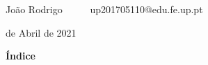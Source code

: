 \documentclass[12pt]{article}
\renewcommand{\_}{\kern-1.5pt\textunderscore\kern-1.5pt}
\begin{document}
\begin{adjustwidth}{0.25in}{0.0in}
{\fontsize{15pt}{18.0pt}\selectfont João Rodrigo \tab \tab \tab \ \ \ \ \  up201705110@edu.fe.up.pt}
\end{adjustwidth}


\vspace{\baselineskip}
\begin{Center}
{\fontsize{16pt}{19.2pt} de Abril de 2021}
\end{Center}

\vspace{\baselineskip}

\vspace{\baselineskip}
{\fontsize{20pt}{24.0pt}\selectfont \textbf{Índice}}

\vspace{\baselineskip}

\vspace{\baselineskip}

\vspace{\baselineskip}

\vspace{\baselineskip}

\vspace{\baselineskip}

\vspace{\baselineskip}

\vspace{\baselineskip}

\vspace{\baselineskip}

\vspace{\baselineskip}

\vspace{\baselineskip}

\vspace{\baselineskip}

\vspace{\baselineskip}

\vspace{\baselineskip}

\vspace{\baselineskip}

\vspace{\baselineskip}

\vspace{\baselineskip}

\vspace{\baselineskip}

\vspace{\baselineskip}
\end{document}
